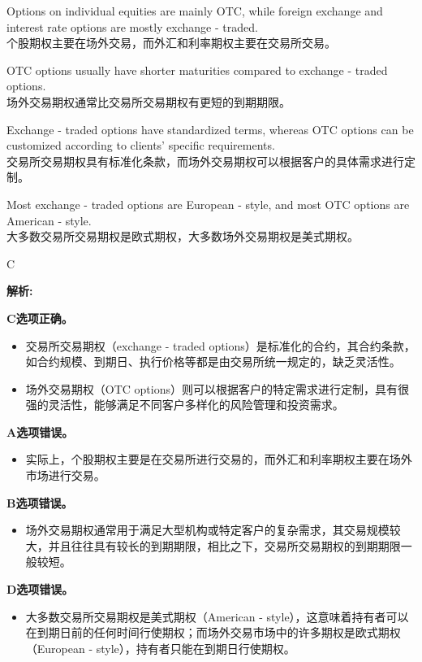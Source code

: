 \documentclass{article}
\newenvironment{explanation}
{\textbf{解析:}\par}
{\par}
\begin{document}
        \begin{choices}
            \item Options on individual equities are mainly OTC, while foreign exchange and interest rate options are mostly exchange - traded.\\
            个股期权主要在场外交易，而外汇和利率期权主要在交易所交易。
            \item OTC options usually have shorter maturities compared to exchange - traded options.\\
            场外交易期权通常比交易所交易期权有更短的到期期限。
            \item Exchange - traded options have standardized terms, whereas OTC options can be customized according to clients' specific requirements.\\
            交易所交易期权具有标准化条款，而场外交易期权可以根据客户的具体需求进行定制。
            \item Most exchange - traded options are European - style, and most OTC options are American - style.\\
            大多数交易所交易期权是欧式期权，大多数场外交易期权是美式期权。
        \end{choices}
        
        \begin{correctanswer}
            C
        \end{correctanswer}
        
        \begin{explanation}
        \textbf{C选项正确。}
        \begin{itemize}
            \item 交易所交易期权（exchange - traded options）是标准化的合约，其合约条款，如合约规模、到期日、执行价格等都是由交易所统一规定的，缺乏灵活性。
            \item 场外交易期权（OTC options）则可以根据客户的特定需求进行定制，具有很强的灵活性，能够满足不同客户多样化的风险管理和投资需求。
        \end{itemize}
        \textbf{A选项错误。}
        \begin{itemize}
            \item 实际上，个股期权主要是在交易所进行交易的，而外汇和利率期权主要在场外市场进行交易。
        \end{itemize}
        \textbf{B选项错误。}
        \begin{itemize}
            \item 场外交易期权通常用于满足大型机构或特定客户的复杂需求，其交易规模较大，并且往往具有较长的到期期限，相比之下，交易所交易期权的到期期限一般较短。
        \end{itemize}
        \textbf{D选项错误。}
        \begin{itemize}
            \item 大多数交易所交易期权是美式期权（American - style），这意味着持有者可以在到期日前的任何时间行使期权；而场外交易市场中的许多期权是欧式期权（European - style），持有者只能在到期日行使期权。
        \end{itemize}
        \end{explanation}
        
\end{document}
